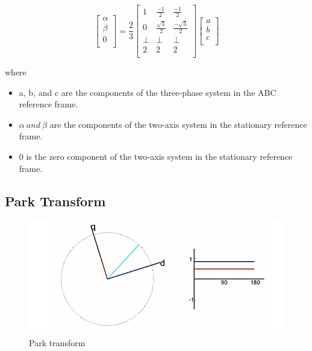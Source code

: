 \documentclass[12pt,a4paper]{book}
\begin{document}
\begin{equation}
  \begin{bmatrix}
    \alpha \\
    \beta \\
    0 \\
    \end{bmatrix} = \frac{2}{3}\begin{bmatrix}
    1 & \frac{- 1}{2} & \frac{- 1}{2} \\
    0 & \frac{\sqrt{3}}{2} & \frac{- \sqrt{3}}{2} \\
    \bot & \bot & \bot \\
    2 & 2 & 2 \\
    \end{bmatrix}\begin{bmatrix}
    a \\
    b \\
    c \\
    \end{bmatrix}
  \label{equation:eq10}
\end{equation}

where
\begin{itemize}
  \item a, b, and c are the components of the three-phase system in the ABC reference frame.
  \item \(\alpha \ and \ \beta\) are the components of the two-axis system in the stationary reference frame.
  \item 0 is the zero component of the two-axis system in the stationary reference frame.
\end{itemize}

\subsection{Park Transform}
\begin{figure}[h]
  \centering
  \includegraphics[width=12cm]{image18.png}
  \caption{Park transform}
  \label{fig:image18}
\end{figure}
\end{document}
